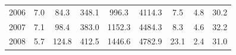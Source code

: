 \documentclass[openany]{book}
\begin{document}
\begin{table}[htbp]
{\begin{tabular}{ccccccccc}
\rowcolor[HTML]{F8F9FA} 
{\color[HTML]{202122} 2006}        & {\color[HTML]{202122} 7.0}                                                                  & {\color[HTML]{202122} 84.3}                                                                         & {\color[HTML]{202122} 348.1}                                                                    & {\color[HTML]{202122} 996.3}                                                                               & {\color[HTML]{202122} 4114.3}                                                                          & {\color[HTML]{202122} 7.5}                                                                            & {\color[HTML]{202122} 4.8}                                                                               & {\color[HTML]{202122} 30.2}                                                                              \\
\rowcolor[HTML]{F8F9FA} 
{\color[HTML]{202122} 2007}        & {\color[HTML]{202122} 7.1}                                                                  & {\color[HTML]{202122} 98.4}                                                                         & {\color[HTML]{202122} 383.0}                                                                    & {\color[HTML]{202122} 1152.3}                                                                              & {\color[HTML]{202122} 4484.3}                                                                          & {\color[HTML]{202122} 8.3}                                                                            & {\color[HTML]{202122} 4.6}                                                                               & {\color[HTML]{202122} 32.2}                                                                              \\
\rowcolor[HTML]{F8F9FA} 
{\color[HTML]{202122} 2008}        & {\color[HTML]{202122} 5.7}                                                                  & {\color[HTML]{202122} 124.8}                                                                        & {\color[HTML]{202122} 412.5}                                                                    & {\color[HTML]{202122} 1446.6}                                                                              & {\color[HTML]{202122} 4782.9}                                                                          & {\color[HTML]{202122} 23.1}                                                                           & {\color[HTML]{202122} 2.4}                                                                               & {\color[HTML]{202122} 31.0}                                                                              \\

\end{tabular}}
\end{table}
\end{document}
